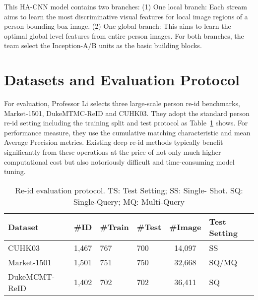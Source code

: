 \documentclass[twocolumn]{article}
\begin{document}
    This HA-CNN model contains two branches: (1) One local branch: Each stream aims to learn the most discriminative visual features for local image regions of a person bounding box image. (2) One global branch: This aims to learn the optimal global level features from entire person images. For both branches, the team select the Inception-A/B \cite{Xiao2016Learning}units as the basic building blocks.

\section{Datasets and Evaluation Protocol}
    For evaluation, Professor Li selects three large-scale person re-id benchmarks, Market-1501, DukeMTMC-ReID and CUHK03. They adopt the standard person re-id setting including the training split and test protocol as Table~\ref{protocol}  shows. For performance measure, they use the cumulative matching characteristic and mean Average Precision metrics. Existing deep re-id methods typically benefit significantly from these operations at the price of not only much higher computational cost but also notoriously difficult and time-consuming model tuning.

\begin{table}[h]
	\centering
	\caption{Re-id evaluation protocol. TS: Test Setting; SS: Single-
		Shot. SQ: Single-Query; MQ: Multi-Query}\label{protocol}
	\begin{tabular}{|p{2cm}|p{0.6cm}|p{0.8cm}|p{0.6cm}|c|p{1cm}|}
		\hline
		Dataset & \#ID & \#Train & \#Test & \#Image& Test Setting\\
		\hline
		CUHK03 & 1,467 & 767 & 700 & 14,097& SS\\
		\hline
		Market-1501 & 1,501 & 751 & 750 &32,668& SQ/MQ\\
		\hline
		DukeMCMT-ReID & 1,402 & 702 & 702 & 36,411& SQ\\
		\hline
	\end{tabular}
\end{table}

	
\end{document}
